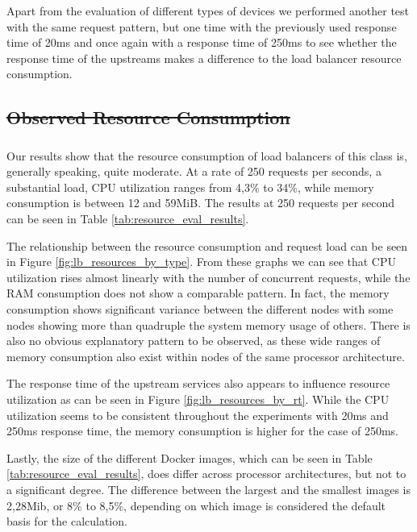 \documentclass[draft,final]{vutinfth} %
\providecommand{\DIFaddtex}[1]{{\protect\color{blue}\uwave{#1}}} %
\providecommand{\DIFdeltex}[1]{{\protect\color{red}\sout{#1}}}                      %
\providecommand{\DIFaddbegin}{} %
\providecommand{\DIFaddend}{} %
\providecommand{\DIFdelbegin}{} %
\providecommand{\DIFdelend}{} %
\providecommand{\DIFadd}[1]{\texorpdfstring{\DIFaddtex{#1}}{#1}} %
\providecommand{\DIFdel}[1]{\texorpdfstring{\DIFdeltex{#1}}{}} %
\begin{document}
Apart from the evaluation of different types of devices we performed another test with the same request pattern, but one time with the previously used response time of 20ms and once again with a response time of 250ms to see whether the response time of the upstreams makes a difference to the load balancer resource consumption.
\DIFdelbegin \subsection{\DIFdel{Observed Resource Consumption}}
\addtocounter{subsection}{-1}%
\DIFdelend \DIFaddbegin \subsubsection{\DIFadd{Observed Resource Consumption}}
\DIFaddend Our results show that the resource consumption of load balancers of this class is, generally speaking, quite moderate.
At a rate of 250 requests per seconds, a substantial load, CPU utilization ranges from 4,3\% to 34\%, while memory consumption is between 12 and 59MiB.
The results at 250 requests per second can be seen in Table \ref{tab:resource_eval_results}.

The relationship between the resource consumption and request load can be seen in Figure \ref{fig:lb_resources_by_type}.
From these graphs we can see that CPU utilization rises almost linearly with the number of concurrent requests, while the RAM consumption does not show a comparable pattern.
In fact, the memory consumption shows significant variance between the different nodes with some nodes showing more than quadruple the system memory usage of others.
There is also no obvious explanatory pattern to be observed, as these wide ranges of memory consumption also exist within nodes of the same processor architecture.

The response time of the upstream services also appears to influence resource utilization as can be seen in Figure \ref{fig:lb_resources_by_rt}.
While the CPU utilization seems to be consistent throughout the experiments with 20ms and 250ms response time, the memory consumption is higher for the case of 250ms.

Lastly, the size of the different Docker images, which can be seen in Table \ref{tab:resource_eval_results}, does differ across processor architectures, but not to a significant degree.
The difference between the largest and the smallest images is 2,28Mib, or 8\% to 8,5\%, depending on which image is considered the default basis for the calculation.
\end{document}
